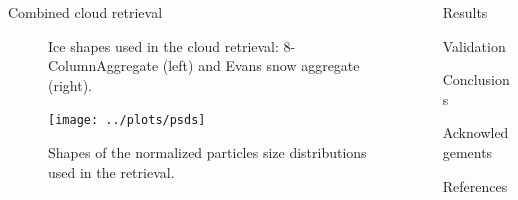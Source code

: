 \documentclass[final,hyperref={pdfpagelabels=false}]{beamer}
\begin{document}
\begin{frame}
\begin{columns}[t]
\begin{column}{.48\linewidth}
\begin{block}{Combined cloud retrieval}
\begin{minipage}[b]{0.6\textwidth}
\begin{figure}
\begin{minipage}{0.8\textwidth}
\begin{minipage}{0.5\textwidth}
             \end{minipage}
           \end{minipage}
           \caption{Ice shapes used in the cloud retrieval: 8-ColumnAggregate (left)
                    and Evans snow aggregate (right).}
           \end{figure}
          \end{minipage}%
          \begin{minipage}[b]{0.5\textwidth}
            \begin{figure}
              \centering
              \texttt{[image: ../plots/psds]}
              \caption{Shapes of the normalized particles size distributions
                       used in the retrieval.}
             \end{figure}
          \end{minipage}

        \end{block}

    \end{column}

          
    \begin{column}{.48\linewidth}

      \begin{block}{Results}
      \end{block}

      \begin{block}{Validation}
      \end{block}

      \begin{block}{Conclusions}
      \end{block}

      \begin{block}{Acknowledgements}
      \end{block}

      \begin{block}{References}
        
        
      \end{block}

    \end{column}
   \end{columns}
  \end{frame}
\end{document}
